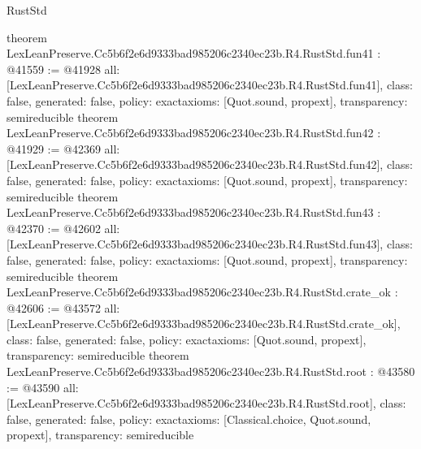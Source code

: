\begin{lexlean}{RustStd}
\begin{coremodule}
{}
theorem LexLeanPreserve.Cc5b6f2e6d9333bad985206c2340ec23b.R4.RustStd.fun41 : @41559 := @41928 {
  all: [LexLeanPreserve.Cc5b6f2e6d9333bad985206c2340ec23b.R4.RustStd.fun41],
  class: false,
  generated: false,
  policy: exact{axioms: [Quot.sound, propext]},
  transparency: semireducible
}
theorem LexLeanPreserve.Cc5b6f2e6d9333bad985206c2340ec23b.R4.RustStd.fun42 : @41929 := @42369 {
  all: [LexLeanPreserve.Cc5b6f2e6d9333bad985206c2340ec23b.R4.RustStd.fun42],
  class: false,
  generated: false,
  policy: exact{axioms: [Quot.sound, propext]},
  transparency: semireducible
}
theorem LexLeanPreserve.Cc5b6f2e6d9333bad985206c2340ec23b.R4.RustStd.fun43 : @42370 := @42602 {
  all: [LexLeanPreserve.Cc5b6f2e6d9333bad985206c2340ec23b.R4.RustStd.fun43],
  class: false,
  generated: false,
  policy: exact{axioms: [Quot.sound, propext]},
  transparency: semireducible
}
theorem LexLeanPreserve.Cc5b6f2e6d9333bad985206c2340ec23b.R4.RustStd.crate_ok : @42606 := @43572 {
  all: [LexLeanPreserve.Cc5b6f2e6d9333bad985206c2340ec23b.R4.RustStd.crate_ok],
  class: false,
  generated: false,
  policy: exact{axioms: [Quot.sound, propext]},
  transparency: semireducible
}
theorem LexLeanPreserve.Cc5b6f2e6d9333bad985206c2340ec23b.R4.RustStd.root : @43580 := @43590 {
  all: [LexLeanPreserve.Cc5b6f2e6d9333bad985206c2340ec23b.R4.RustStd.root],
  class: false,
  generated: false,
  policy: exact{axioms: [Classical.choice, Quot.sound, propext]},
  transparency: semireducible
}


\end{coremodule}
\end{lexlean}

